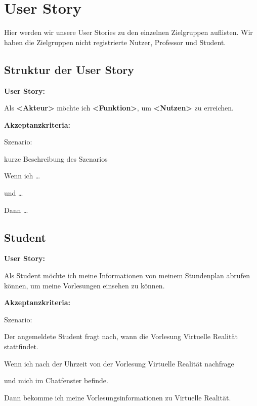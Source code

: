 \section{User Story}
Hier werden wir unsere User Stories zu den einzelnen Zielgruppen auflisten.
Wir haben die Zielgruppen nicht registrierte Nutzer, Professor und Student.

\subsection{Struktur der User Story}
\textbf{User Story:}
\newline

\noindent Als \textbf{<Akteur>} möchte ich \textbf{<Funktion>}, um \textbf{<Nutzen>} zu erreichen.
\newline

\noindent \textbf{Akzeptanzkriteria:}
\newline

\noindent Szenario: 

\noindent kurze Beschreibung des Szenarios
\newline

\noindent Wenn ich \dots

\noindent und \dots

\noindent Dann \dots

\subsection{Student}

\textbf{User Story:}
\newline

\noindent Als Student möchte ich meine Informationen von meinem Stundenplan abrufen können,
um meine Vorlesungen einsehen zu können.
\newline

\noindent \textbf{Akzeptanzkriteria:}
\newline

\noindent Szenario: 

\noindent Der angemeldete Student fragt nach, wann die Vorlesung Virtuelle Realität stattfindet.
\newline

\noindent Wenn ich nach der Uhrzeit von der Vorlesung Virtuelle Realität nachfrage

\noindent und mich im Chatfenster befinde.

\noindent Dann bekomme ich meine Vorlesungsinformationen zu Virtuelle Realität.

